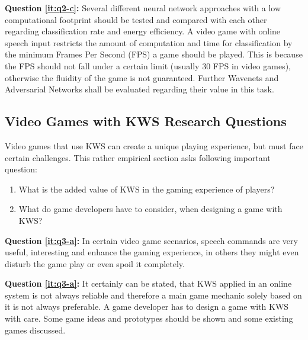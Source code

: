 \textbf{Question \ref{it:q2-c}:}
Several different neural network approaches with a low computational footprint should be tested and compared with each other regarding classification rate and energy efficiency. 
A video game with online speech input restricts the amount of computation and time for classification by the minimum Frames Per Second (FPS) a game should be played.
This is because the FPS should not fall under a certain limit (usually 30 FPS in video games), otherwise the fluidity of the game is not guaranteed.
Further Wavenets and Adversarial Networks shall be evaluated regarding their value in this task.



\subsection{Video Games with KWS Research Questions}\label{sec:intro_rq_games}
Video games that use KWS can create a unique playing experience, but must face certain challenges.
This rather empirical section asks following important question:

\begin{enumerate}[label={Q.3.\alph*)}, leftmargin=1.75cm]
  \item What is the added value of KWS in the gaming experience of players?\label{it:q3-a}
  \item What do game developers have to consider, when designing a game with KWS?\label{it:q3-b}
\end{enumerate}
\noindent
\textbf{Question \ref{it:q3-a}:} %
In certain video game scenarios, speech commands are very useful, interesting and enhance the gaming experience, in others they might even disturb the game play or even spoil it completely.

\textbf{Question \ref{it:q3-a}:} It certainly can be stated, that KWS applied in an online system is not always reliable and therefore a main game mechanic solely based on it is not always preferable.
A game developer has to design a game with KWS with care.
Some game ideas and prototypes should be shown and some existing games discussed.

